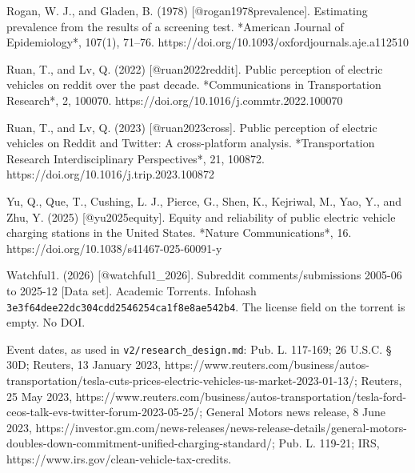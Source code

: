 \documentclass[11pt]{article}
\begin{document}
Rogan, W. J., and Gladen, B. (1978) [@rogan1978prevalence]. Estimating prevalence from the results of a screening test. *American Journal of Epidemiology*, 107(1), 71–76. https://doi.org/10.1093/oxfordjournals.aje.a112510


Ruan, T., and Lv, Q. (2022) [@ruan2022reddit]. Public perception of electric vehicles on reddit over the past decade. *Communications in Transportation Research*, 2, 100070. https://doi.org/10.1016/j.commtr.2022.100070


Ruan, T., and Lv, Q. (2023) [@ruan2023cross]. Public perception of electric vehicles on Reddit and Twitter: A cross-platform analysis. *Transportation Research Interdisciplinary Perspectives*, 21, 100872. https://doi.org/10.1016/j.trip.2023.100872


Yu, Q., Que, T., Cushing, L. J., Pierce, G., Shen, K., Kejriwal, M., Yao, Y., and Zhu, Y. (2025) [@yu2025equity]. Equity and reliability of public electric vehicle charging stations in the United States. *Nature Communications*, 16. https://doi.org/10.1038/s41467-025-60091-y


Watchful1. (2026) [@watchful1\_2026]. Subreddit comments/submissions 2005-06 to 2025-12 [Data set]. Academic Torrents. Infohash \texttt{3e3f64dee22dc304cdd2546254ca1f8e8ae542b4}. The license field on the torrent is empty. No DOI.


Event dates, as used in \texttt{v2/research\_design.md}: Pub. L. 117-169; 26 U.S.C. § 30D; Reuters, 13 January 2023, https://www.reuters.com/business/autos-transportation/tesla-cuts-prices-electric-vehicles-us-market-2023-01-13/; Reuters, 25 May 2023, https://www.reuters.com/business/autos-transportation/tesla-ford-ceos-talk-evs-twitter-forum-2023-05-25/; General Motors news release, 8 June 2023, https://investor.gm.com/news-releases/news-release-details/general-motors-doubles-down-commitment-unified-charging-standard/; Pub. L. 119-21; IRS, https://www.irs.gov/clean-vehicle-tax-credits.
\end{document}
